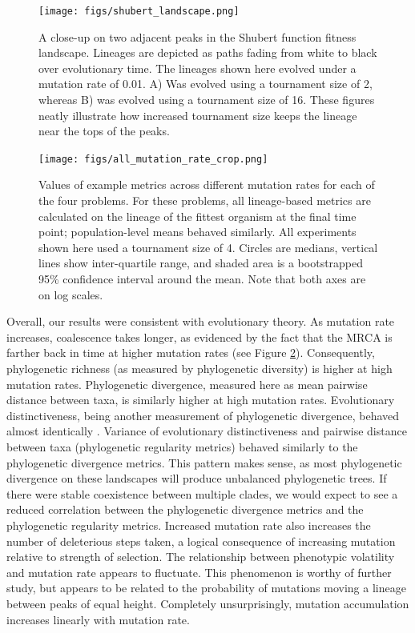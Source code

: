 \documentclass[letterpaper]{article}
\newcommand{\reduceCaptionPadding}{\setlength{\belowcaptionskip}{-10pt}}
\begin{document}
\begin{figure}
\centering
\texttt{[image: figs/shubert\_landscape.png]}
\reduceCaptionPadding
\caption{\small A close-up on two adjacent peaks in the Shubert function fitness landscape. Lineages are depicted as paths fading from white to black over evolutionary time. The lineages shown here evolved under a mutation rate of 0.01. A) Was evolved using a tournament size of 2, whereas B) was evolved using a tournament size of 16. These figures neatly illustrate how increased tournament size keeps the lineage near the tops of the peaks.}
\label{fig:lineageviz}
\end{figure}


\begin{figure}
\centering
\texttt{[image: figs/all\_mutation\_rate\_crop.png]}
\reduceCaptionPadding
\caption{\small Values of example metrics across different mutation rates for each of the four problems. For these problems, all lineage-based metrics are calculated on the lineage of the fittest organism at the final time point; %
population-level means behaved similarly. All experiments shown here used a tournament size of 4. Circles are medians, vertical lines show inter-quartile range, and shaded area is a bootstrapped 95\% confidence interval around the mean. Note that both axes are on log scales.}
\label{fig:mutation_rate}
\end{figure}


Overall, our results were consistent with evolutionary theory. As mutation rate increases, coalescence takes longer, as evidenced by the fact that the MRCA is farther back in time at higher mutation rates (see Figure \ref{fig:mutation_rate}). Consequently, phylogenetic richness (as measured by phylogenetic diversity) is higher at high mutation rates. Phylogenetic divergence, measured here as mean pairwise distance between taxa, is similarly higher at high mutation rates. Evolutionary distinctiveness, being another measurement of phylogenetic divergence, behaved almost identically \citep{supplement}. Variance of evolutionary distinctiveness and pairwise distance between taxa (phylogenetic regularity metrics) behaved similarly to the phylogenetic divergence metrics. This pattern makes sense, as most phylogenetic divergence on these landscapes will produce unbalanced phylogenetic trees. If there were stable coexistence between multiple clades, we would expect to see a reduced correlation between the phylogenetic divergence metrics and the phylogenetic regularity metrics. Increased mutation rate also increases the number of deleterious steps taken, a logical consequence of increasing mutation relative to strength of selection. The relationship between phenotypic volatility and mutation rate appears to fluctuate. This phenomenon is worthy of further study, but appears to be related to the probability of mutations moving a lineage between peaks of equal height. Completely unsurprisingly, mutation accumulation increases linearly with mutation rate.
\end{document}
